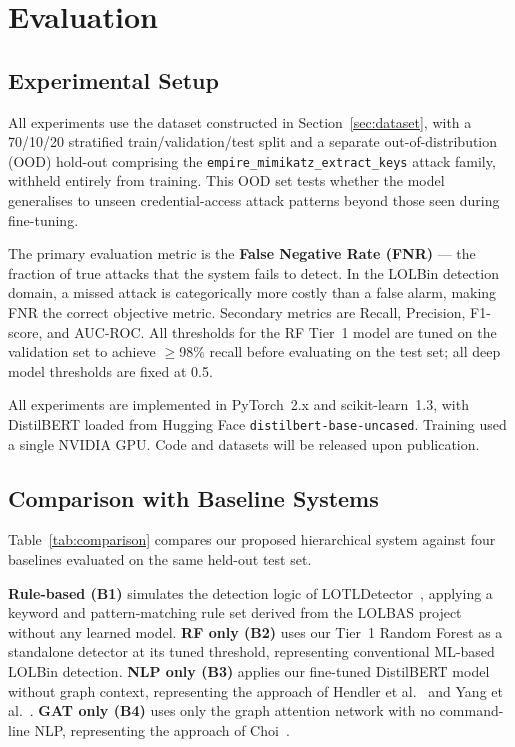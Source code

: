 \section{Evaluation}
\label{sec:evaluation}

\subsection{Experimental Setup}

All experiments use the dataset constructed in Section~\ref{sec:dataset},
with a 70/10/20 stratified train/validation/test split and a separate
out-of-distribution (OOD) hold-out comprising the \texttt{empire\_mimikatz\_extract\_keys}
attack family, withheld entirely from training. This OOD set tests whether the
model generalises to unseen credential-access attack patterns beyond those seen
during fine-tuning.

The primary evaluation metric is the \textbf{False Negative Rate (FNR)} ---
the fraction of true attacks that the system fails to detect. In the LOLBin
detection domain, a missed attack is categorically more costly than a false
alarm, making FNR the correct objective metric. Secondary metrics are
Recall, Precision, F1-score, and AUC-ROC. All thresholds for the RF Tier~1
model are tuned on the validation set to achieve $\geq$98\% recall before
evaluating on the test set; all deep model thresholds are fixed at 0.5.

All experiments are implemented in PyTorch~2.x and scikit-learn~1.3,
with DistilBERT loaded from Hugging Face \texttt{distilbert-base-uncased}.
Training used a single NVIDIA GPU. Code and datasets will be released upon
publication.

\subsection{Comparison with Baseline Systems}
\label{sec:baselines}

Table~\ref{tab:comparison} compares our proposed hierarchical system against
four baselines evaluated on the same held-out test set.

\textbf{Rule-based (B1)} simulates the detection logic of LOTLDetector~\cite{zhu2026lotldetector},
applying a keyword and pattern-matching rule set derived from the LOLBAS project
without any learned model. \textbf{RF only (B2)} uses our Tier~1 Random Forest
as a standalone detector at its tuned threshold, representing conventional
ML-based LOLBin detection. \textbf{NLP only (B3)} applies our fine-tuned
DistilBERT model without graph context, representing the approach of Hendler
et al.~\cite{hendler2020amsi} and Yang et al.~\cite{yang2023robust}.
\textbf{GAT only (B4)} uses only the graph attention network with no command-line
NLP, representing the approach of Choi~\cite{choi2021powershell}.

